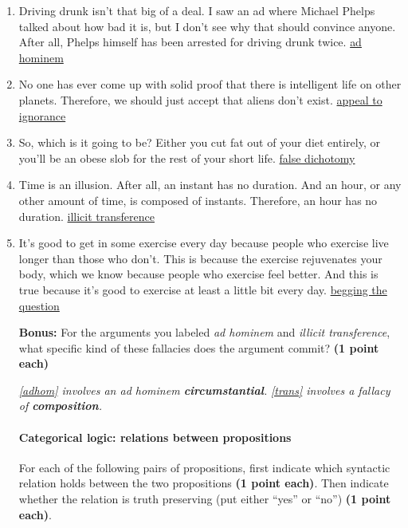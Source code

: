 \documentclass[10pt]{article}
\begin{document}
\begin{enumerate}
\item Driving drunk isn't that big of a deal. I saw an ad where Michael Phelps talked about how bad it is, but I don't see why that should convince anyone. After all, Phelps himself has been arrested for driving drunk twice. \underline{  ad hominem  }\label{adhom}

\item No one has ever come up with solid proof that there is intelligent life on other planets. Therefore, we should just accept that aliens don't exist. \underline{  appeal to ignorance  }

\item So, which is it going to be? Either you cut fat out of your diet entirely, or you'll be an obese slob for the rest of your short life. \underline{  false dichotomy  }

\item Time is an illusion. After all, an instant has no duration. And an hour, or any other amount of time, is composed of instants. Therefore, an hour has no duration. \underline{  illicit transference  }\label{trans}

\item It’s good to get in some exercise every day because people who exercise live longer than those who don’t. This is because the exercise rejuvenates your body, which we know because people who exercise feel better. And this is true because it's good to exercise at least a little bit every day. \underline{  begging the question  }


\textbf{Bonus:} For the arguments you labeled \textit{ad hominem} and \textit{illicit transference}, what specific kind of these fallacies does the argument commit? \textbf{(1 point each)}

\vspace{2mm}
\textit{\ref{adhom} involves an ad hominem \textbf{circumstantial}.}
\textit{\ref{trans} involves a fallacy of \textbf{composition}.}
\vspace{2mm}

\paragraph{Categorical logic: relations between propositions}

For each of the following pairs of propositions, first indicate which syntactic relation holds between the two propositions \textbf{(1 point each)}. Then indicate whether the relation is truth preserving (put either ``yes'' or ``no'') \textbf{(1 point each)}.


\end{enumerate}
\end{document}
